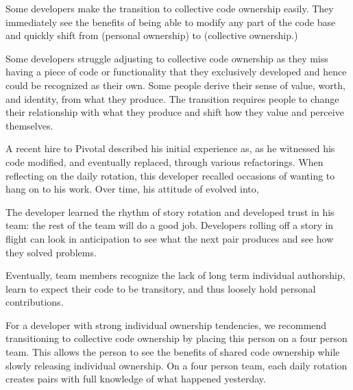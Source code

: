 \begin{table}[]
Some developers make the transition to collective code ownership easily. They immediately see the benefits of being able to modify any part of the code base and quickly shift from  (personal ownership) to  (collective ownership.)

Some developers struggle adjusting to collective code ownership as they miss having a piece of code or functionality that they exclusively developed and hence could be recognized as their own. Some people derive their sense of value, worth, and identity, from what they produce. The transition requires people to change their relationship with what they produce and shift how they value and perceive themselves. 

A recent hire to Pivotal described his initial experience as,  as he witnessed his code modified, and eventually replaced, through various refactorings. When reflecting on the daily rotation, this developer recalled occasions of wanting to hang on to his work.  Over time, his attitude of  evolved into,  

The developer learned the rhythm of story rotation and developed trust in his team: the rest of the team will do a good job. Developers rolling off a story in flight can look in anticipation to see what the next pair produces and see how they solved problems. 

Eventually, team members recognize the lack of long term individual authorship, learn to expect their code to be transitory, and thus loosely hold personal contributions.   

For a developer with strong individual ownership tendencies, we recommend transitioning to collective code ownership by placing this person on a four person team. This allows the person to see the benefits of shared code ownership while slowly releasing individual ownership. On a four person team, each daily rotation creates pairs with full knowledge of what happened yesterday.  



\end{table}
